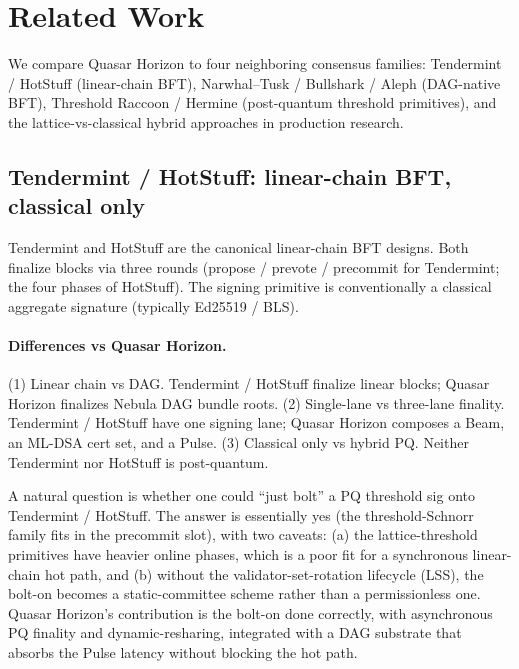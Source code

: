 \section{Related Work}
\label{sec:related-work}

We compare Quasar Horizon to four neighboring consensus families: Tendermint / HotStuff (linear-chain BFT), Narwhal--Tusk / Bullshark / Aleph (DAG-native BFT), Threshold Raccoon / Hermine (post-quantum threshold primitives), and the lattice-vs-classical hybrid approaches in production research.

\subsection{Tendermint / HotStuff: linear-chain BFT, classical only}

Tendermint \cite{tendermint} and HotStuff \cite{hotstuff} are the canonical linear-chain BFT designs. Both finalize blocks via three rounds (propose / prevote / precommit for Tendermint; the four phases of HotStuff). The signing primitive is conventionally a classical aggregate signature (typically Ed25519 / BLS).

\paragraph{Differences vs Quasar Horizon.} (1) Linear chain vs DAG. Tendermint / HotStuff finalize linear blocks; Quasar Horizon finalizes Nebula DAG bundle roots. (2) Single-lane vs three-lane finality. Tendermint / HotStuff have one signing lane; Quasar Horizon composes a Beam, an ML-DSA cert set, and a Pulse. (3) Classical only vs hybrid PQ. Neither Tendermint nor HotStuff is post-quantum.

A natural question is whether one could ``just bolt'' a PQ threshold sig onto Tendermint / HotStuff. The answer is essentially yes (the threshold-Schnorr family fits in the precommit slot), with two caveats: (a) the lattice-threshold primitives have heavier online phases, which is a poor fit for a synchronous linear-chain hot path, and (b) without the validator-set-rotation lifecycle (LSS), the bolt-on becomes a static-committee scheme rather than a permissionless one. Quasar Horizon's contribution is the bolt-on done correctly, with asynchronous PQ finality and dynamic-resharing, integrated with a DAG substrate that absorbs the Pulse latency without blocking the hot path.

